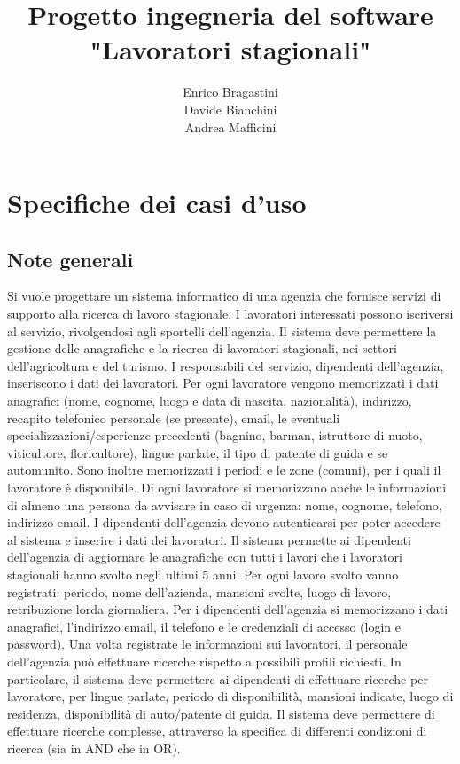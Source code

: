 \documentclass[a4paper, oneside, 12pt]{article}
\begin{document}
\title{Progetto ingegneria del software \\ "Lavoratori stagionali"}
\author{Enrico Bragastini \\ Davide Bianchini \\ Andrea Mafficini}
\maketitle

\newpage

\tableofcontents

\newpage

\section{Specifiche dei casi d'uso}

\subsection{Note generali}
Si vuole progettare un sistema informatico di una agenzia che fornisce servizi di supporto alla ricerca
di lavoro stagionale. I lavoratori interessati possono iscriversi al servizio, rivolgendosi agli sportelli
dell'agenzia. Il sistema deve permettere la gestione delle anagrafiche e la ricerca di lavoratori
stagionali, nei settori dell'agricoltura e del turismo.
I responsabili del servizio, dipendenti dell'agenzia, inseriscono i dati dei lavoratori. Per ogni
lavoratore vengono memorizzati i dati anagrafici (nome, cognome, luogo e data di nascita,
nazionalità), indirizzo, recapito telefonico personale (se presente), email, le eventuali
specializzazioni/esperienze precedenti (bagnino, barman, istruttore di nuoto, viticultore,
floricultore), lingue parlate, il tipo di patente di guida e se automunito. Sono inoltre memorizzati i
periodi e le zone (comuni), per i quali il lavoratore è disponibile. Di ogni lavoratore si memorizzano
anche le informazioni di almeno una persona da avvisare in caso di urgenza: nome, cognome,
telefono, indirizzo email.
I dipendenti dell'agenzia devono autenticarsi per poter accedere al sistema e inserire i dati dei
lavoratori. Il sistema permette ai dipendenti dell'agenzia di aggiornare le anagrafiche con tutti i
lavori che i lavoratori stagionali hanno svolto negli ultimi 5 anni. Per ogni lavoro svolto vanno
registrati: periodo, nome dell'azienda, mansioni svolte, luogo di lavoro, retribuzione lorda
giornaliera. Per i dipendenti dell'agenzia si memorizzano i dati anagrafici, l'indirizzo email, il telefono
e le credenziali di accesso (login e password).
Una volta registrate le informazioni sui lavoratori, il personale dell'agenzia può effettuare ricerche
rispetto a possibili profili richiesti.
In particolare, il sistema deve permettere ai dipendenti di effettuare ricerche per lavoratore, per
lingue parlate, periodo di disponibilità, mansioni indicate, luogo di residenza, disponibilità di
auto/patente di guida. Il sistema deve permettere di effettuare ricerche complesse, attraverso la
specifica di differenti condizioni di ricerca (sia in AND che in OR).
\end{document}
